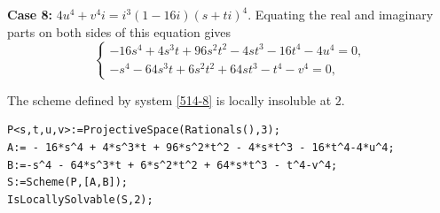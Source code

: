 \documentclass[a4paper,12pt,english,reqno]{amsart}
\begin{document}
{\bf Case 8:} $4u^4+v^4i=i^3(1-16i)(s+ti)^4$. Equating the real and imaginary parts on both sides of this equation gives
\begin{equation}\label{514-8}
\begin{cases}
- 16s^4 + 4s^3t + 96s^2t^2 - 4st^3 - 16t^4-4u^4=0,\\
-s^4 - 64s^3t + 6s^2t^2 + 64st^3 - t^4-v^4=0,
\end{cases}
\end{equation}

The scheme defined by system \eqref{514-8} is locally insoluble at $2$.



\begin{lstlisting}
P<s,t,u,v>:=ProjectiveSpace(Rationals(),3);
A:= - 16*s^4 + 4*s^3*t + 96*s^2*t^2 - 4*s*t^3 - 16*t^4-4*u^4;
B:=-s^4 - 64*s^3*t + 6*s^2*t^2 + 64*s*t^3 - t^4-v^4;
S:=Scheme(P,[A,B]);
IsLocallySolvable(S,2);
\end{lstlisting}
\end{document}
